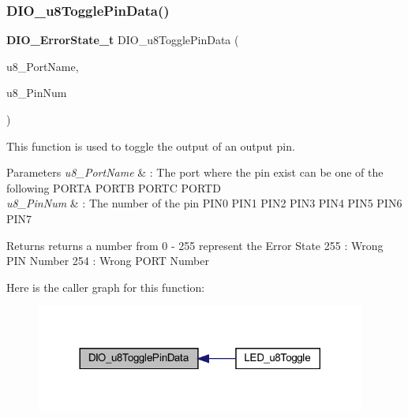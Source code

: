 \subsubsection{D\+I\+O\+\_\+u8\+Toggle\+Pin\+Data()}
{\footnotesize\ttfamily \textbf{ D\+I\+O\+\_\+\+Error\+State\+\_\+t} D\+I\+O\+\_\+u8\+Toggle\+Pin\+Data (\begin{DoxyParamCaption}\item[{\textbf{ D\+I\+O\+Port\+\_\+t}}]{u8\+\_\+\+Port\+Name,  }\item[{\textbf{ D\+I\+O\+Pin\+\_\+t}}]{u8\+\_\+\+Pin\+Num }\end{DoxyParamCaption})}



This function is used to toggle the output of an output pin. 


\begin{DoxyParams}{Parameters}
{\em u8\+\_\+\+Port\+Name} & \+: The port where the pin exist can be one of the following P\+O\+R\+TA P\+O\+R\+TB P\+O\+R\+TC P\+O\+R\+TD \\
\hline
{\em u8\+\_\+\+Pin\+Num} & \+: The number of the pin P\+I\+N0 P\+I\+N1 P\+I\+N2 P\+I\+N3 P\+I\+N4 P\+I\+N5 P\+I\+N6 P\+I\+N7 \\
\hline
\end{DoxyParams}
\begin{DoxyReturn}{Returns}
returns a number from 0 -\/ 255 represent the Error State 255 \+: Wrong P\+IN Number 254 \+: Wrong P\+O\+RT Number 
\end{DoxyReturn}
Here is the caller graph for this function\+:\nopagebreak
\begin{figure}[H]
\begin{center}
\leavevmode
\includegraphics[width=308pt]{_d_i_o__interface_8h_a105d674e17ed95c8016fa7f6a1c6dde0_icgraph}
\end{center}
\end{figure}
